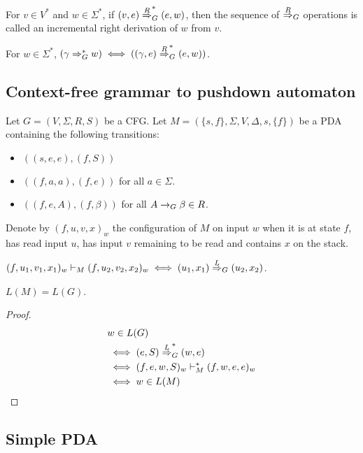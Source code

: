 For $v \in V^*$ and $w \in \Sigma^*$, if $(v, e) \overset{R}{\Rightarrow}_{G}^* (e, w)$,
then the sequence of $\overset{R}{\Rightarrow}_{G}$ operations
is called an incremental right derivation of $w$ from $v$.

\begin{theorem}
For $w \in \Sigma^*$,
$(\gamma \Rightarrow_{G}^* w) \iff ((\gamma, e) \overset{R}{\Rightarrow}_{G}^* (e, w))$.
\end{theorem}

\subsection{Context-free grammar to pushdown automaton}

Let $G = (V, \Sigma, R, S)$ be a CFG.
Let $M = (\{s, f\}, \Sigma, V, \Delta, s, \{f\})$ be a PDA
containing the following transitions:
\begin{itemize}
\item $((s, e, e), (f, S))$
\item $((f, a, a), (f, e))$ for all $a \in \Sigma$.
\item $((f, e, A), (f, \beta))$ for all $A \rightarrow_{G} \beta \in R$.
\end{itemize}

Denote by $(f, u, v, x)_w$ the configuration of $M$ on input $w$ when it is at state $f$,
has read input $u$, has input $v$ remaining to be read and contains $x$ on the stack.

\begin{theorem}
$(f, u_1, v_1, x_1)_w \vdash_M (f, u_2, v_2, x_2)_w \iff (u_1, x_1) \overset{L}{\Rightarrow}_{G} (u_2, x_2)$.
\end{theorem}
\begin{theorem}$L(M) = L(G)$.\end{theorem}
\begin{proof}
\begin{align*}
& w \in L(G)
\\ &\iff (e, S) \overset{L}{\Rightarrow}_{G}^* (w, e)
\\ &\iff (f, e, w, S)_w \vdash_M^* (f, w, e, e)_w
\\ &\iff w \in L(M)
\end{align*}
\end{proof}

\subsection{Simple PDA}

